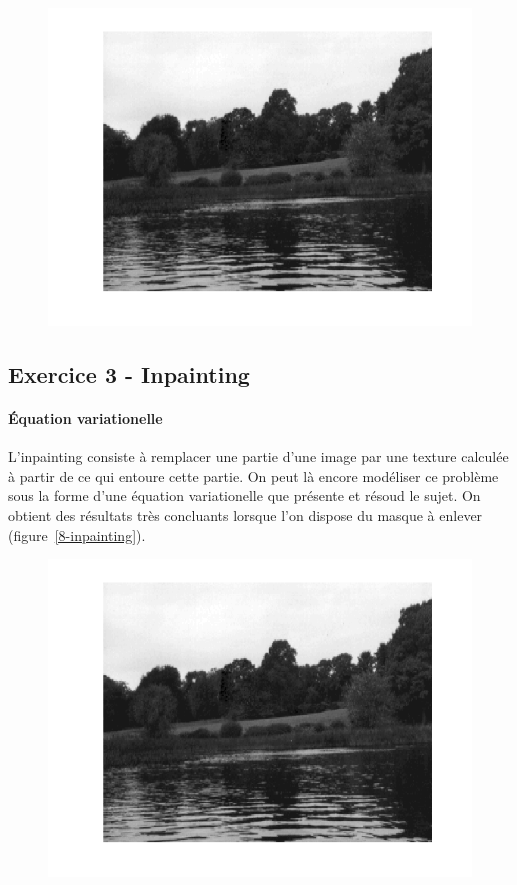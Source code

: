 \documentclass{article}
\begin{document}
\begin{figure}[!ht]
\includegraphics[width=\textwidth]{images/1/1-1-autumn_b.png}
\end{figure}

\subsection{Exercice 3 - Inpainting}
\paragraph{Équation variationelle}
L'inpainting consiste à remplacer une partie d'une image par une texture calculée à partir de ce qui entoure cette partie. On peut là encore modéliser ce problème sous la forme d'une équation variationelle que présente et résoud le sujet. On obtient des résultats très concluants lorsque l'on dispose du masque à enlever (figure~\ref{8-inpainting}).

\begin{figure}[!ht]
\includegraphics[width=\textwidth]{images/1/1-1-autumn_b.png}
\end{figure}
\end{document}
